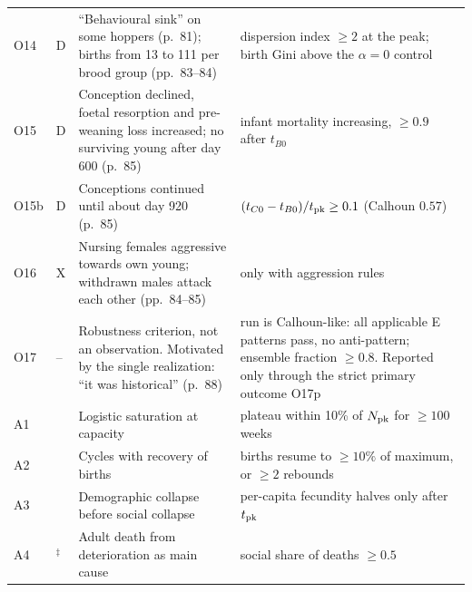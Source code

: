 \documentclass[pre,onecolumn,superscriptaddress,notitlepage]{revtex4-2}
\begin{document}
{\begin{longtable}{@{}p{}p{}p{}p{}@{}}
O14 & D & ``Behavioural sink'' on some hoppers (p.~81); births from 13 to 111 per brood group (pp.~83--84) & dispersion index $\ge 2$ at the peak; birth Gini above the $\alpha=0$ control \\
O15 & D & Conception declined, foetal resorption and pre-weaning loss increased; no surviving young after day 600 (p.~85) & infant mortality increasing, $\ge 0.9$ after $t_{B0}$ \\
O15b & D & Conceptions continued until about day 920 (p.~85) & $(t_{C0}-t_{B0})/t_{\rm pk}\ge 0.1$ (Calhoun $0.57$) \\
O16 & X & Nursing females aggressive towards own young; withdrawn males attack each other (pp.~84--85) & only with aggression rules \\
O17 & -- & Robustness criterion, not an observation. Motivated by the single realization: ``it was historical'' (p.~88) & run is Calhoun-like: all applicable E patterns pass, no anti-pattern; ensemble fraction $\ge 0.8$. Reported only through the strict primary outcome O17p \\
\midrule
A1 & & Logistic saturation at capacity & plateau within 10\% of $N_{\rm pk}$ for $\ge 100$ weeks \\
A2 & & Cycles with recovery of births & births resume to $\ge 10\%$ of maximum, or $\ge 2$ rebounds \\
A3 & & Demographic collapse before social collapse & per-capita fecundity halves only after $t_{\rm pk}$ \\
A4 & $^\ddagger$ & Adult death from deterioration as main cause & social share of deaths $\ge 0.5$ \\
\end{longtable}
}
\end{document}
